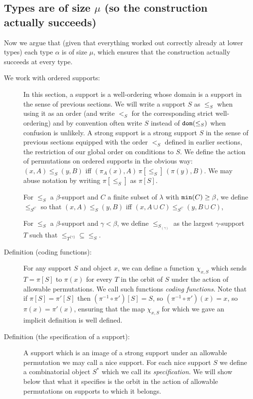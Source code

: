 \documentclass[112pt]{article}
\begin{document}
\newpage
\subsection{Types are of size $\mu$ (so the construction actually succeeds)}

Now we argue that (given that everything worked out correctly already at lower types) each type $\alpha$ is of size $\mu$, which ensures
that the construction actually succeeds at every type.

\begin{description}

\item[We work with ordered supports:]  In this section, a support is a well-ordering whose domain is a support in the sense of previous sections.  We will write a support $S$ as $\leq_S$ when using it as an order (and write $<_S$ for the corresponding strict well-ordering) and by convention often write
$S$ instead of ${\tt dom}(\leq_S)$ when confusion is unlikely.  A strong support is a strong support $S$ in the sense of previous sections equipped with the order $<_S$ defined in earlier sections, the restriction of our global order on conditions to $S$.  We define the action of permutations
on ordered supports in the obvious way:  $(x,A) \leq_S (y,B)$ iff $(\pi_A(x),A)\, \pi[\leq_S]\, (\pi(y),B)$.  We may abuse notation by writing $\pi[\leq_S]$ as $\pi[S]$.

For $\leq_S$ a $\beta$-support and $C$ a finite subset of $\lambda$ with ${\tt min}(C) \geq \beta$, we define $\leq_{S^C}$ so that $(x,A) \leq_S (y,B)$ iff $(x,A \cup C) \leq_{S^C} (y,B \cup C)$,

For $\leq_S$ a $\beta$-support and $\gamma<\beta$, we define $\leq_{S_{(\gamma)}}$ as the largest $\gamma$-support $T$ such that $\leq_{T^{\{\gamma\}}} \subseteq \leq_S$.

\item[Definition (coding functions):]  For any support $S$ and object $x$, we can define a function $\chi_{x,S}$ which sends $T=\pi[S]$ to $\pi(x)$ for every $T$ in the orbit of $S$ under
the action of allowable permutations.  We call such functions {\em coding functions\/}.  Note that if $\pi[S]=\pi'[S]$ then $(\pi^{-1}\circ \pi')[S]= S$, so 
$(\pi^{-1}\circ \pi')(x)= x$, so $\pi(x)=\pi'(x)$, ensuring that the map $\chi_{x,S}$ for which we gave an implicit definition is well defined.

\item[Definition (the specification of a support):]  A support which is an image of a strong support under an allowable permutation we may call a nice support.  For each nice support $S$ we define a combinatorial object $S^*$ which we call its {\em specification\/}.  We will show below that what it specifies is the orbit in the action of allowable permutations on supports to which it belongs.


\end{description}
\end{document}
